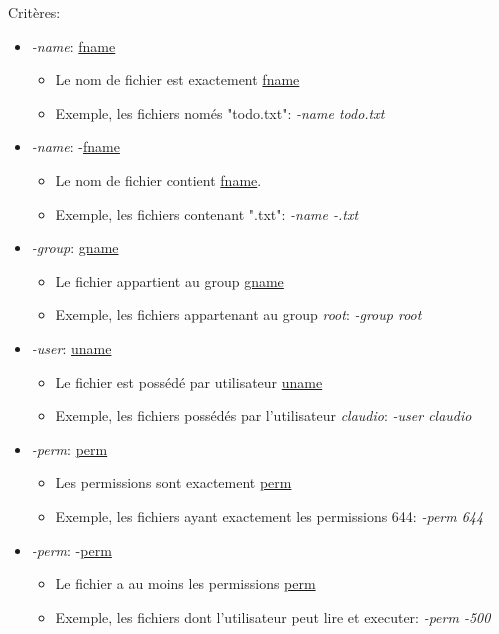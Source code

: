 \documentclass[11pt, a4paper]{article}
\begin{document}
Critères:
\begin{itemize}
	\renewcommand\labelitemi{}
	\renewcommand\labelitemii{}
	\renewcommand\labelitemiii{}
	\item \textit{-name}: \underline{fname}
	\begin{itemize}
		\item Le nom de fichier est exactement \underline{fname}
		\item Exemple, les fichiers només  "todo.txt": \textit{-name todo.txt}
	\end{itemize}
	\item \textit{-name}: -\underline{fname} 
	\begin{itemize}
		\item     Le nom de fichier contient \underline{fname}.
		\item     Exemple, les fichiers contenant ".txt":
		\textit{-name -.txt}
	\end{itemize}
	\item \textit{-group}: \underline{gname}
	\begin{itemize}
		\item 	   	Le fichier appartient au group \underline{gname}
		\item 	   	Exemple, les fichiers appartenant au group \textit{root}: \textit{-group root}
	\end{itemize}
	\item \textit{-user}: \underline{uname}
	\begin{itemize}
		\item 		Le fichier est possédé par utilisateur \underline{uname} 
		\item 	   	Exemple, les fichiers possédés par l'utilisateur \textit{claudio}: \textit{-user claudio}
	\end{itemize}
	\item \textit{-perm}: \underline{perm}
	\begin{itemize}
		\item 		Les permissions sont exactement \underline{perm}
		\item 		Exemple, les fichiers ayant exactement les permissions 644: \textit{-perm 644}
	\end{itemize}
	\item \textit{-perm}: -\underline{perm}
	\begin{itemize}
		\item 		Le fichier a au moins les permissions \underline{perm}
		\item 		Exemple, les fichiers dont l'utilisateur peut lire et executer: \textit{-perm -500}

\end{itemize}
\end{itemize}
\end{document}
